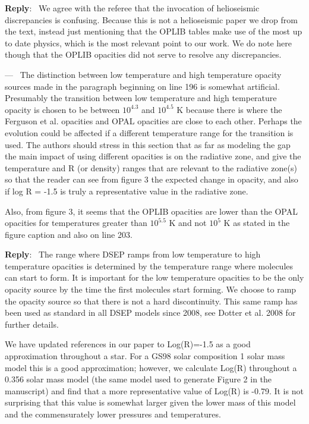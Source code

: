 \documentclass[11pt]{article}
\newcounter{reviewer}
\newcounter{point}[reviewer]
\renewcommand{\thepoint}{\arabic{point})}
\newenvironment{point}
   {\refstepcounter{point} \bigskip \noindent {\textbf{Referee~Point~\thepoint} } ---\ }
   {\par }
\newenvironment{reply}
   {\medskip \noindent \begin{sf}\textbf{Reply}:\  }
   {\medskip \end{sf}}
\begin{document}
\begin{reply}
	We agree with the referee that the invocation of helioseismic discrepancies
	is confusing. Because this is not a helioseismic paper we drop from the
	text, instead just mentioning that the OPLIB tables make use of the most up
	to date physics, which is the most relevant point to our work. We do note
	here though that the OPLIB opacities did not serve to resolve any
	discrepancies.
\end{reply}

\begin{point}
	The distinction between low temperature and high temperature opacity sources
	made in the paragraph beginning on line 196 is somewhat artificial.
	Presumably the transition between low temperature and high temperature
	opacity is chosen to be between $10^{4.3}$ and $10^{4.5}$ K because there
	is where the Ferguson et al. opacities and OPAL opacities are close to each
	other. Perhaps the evolution could be affected if a different temperature
	range for the transition is used. The authors should stress in this section
	that as far as modeling the gap the main impact of using different
	opacities is on the radiative zone, and give the temperature and R (or
	density) ranges that are relevant to the radiative zone(s) so that the
	reader can see from figure 3 the expected change in opacity, and also if
	log R = -1.5 is truly a representative value in the radiative zone.

	Also, from figure 3, it seems that the OPLIB opacities are lower than the OPAL
	opacities for temperatures greater than $10^{5.5}$ K and not $10^{5}$ K as
	stated in the figure caption and also on line 203.
	\label{pt:lowtempboundary}
\end{point}

\begin{reply}
	The range where DSEP ramps from low temperature to high temperature
	opacities is determined by the temperature range where molecules can start
	to form. It is important for the low temperature opacities to be the only
	opacity source by the time the first molecules start forming. We choose to
	ramp the opacity source so that there is not a hard discontinuity. This
	same ramp has been used as standard in all DSEP models since 2008, see
	Dotter et al. 2008 for further details.

	We have updated references in our paper to Log(R)=-1.5 as a good approximation
	throughout a star. For a GS98 solar composition 1 solar mass model this is
	a good approximation; however, we calculate Log(R) throughout a 0.356 solar
	mass model (the same model used to generate Figure 2 in the manuscript) and
	find that a more representative value of Log(R) is -0.79. It is not surprising
	that this value is somewhat larger given the lower mass of this model and
	the commensurately lower pressures and temperatures.
\end{reply}
\end{document}
